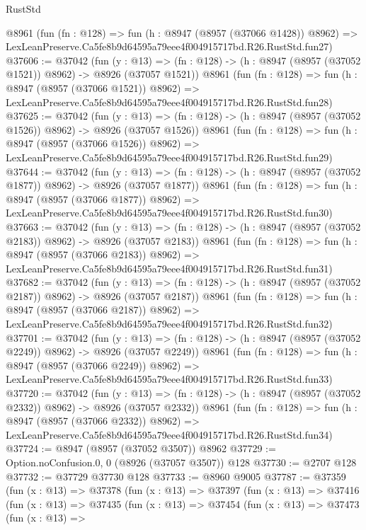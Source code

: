\begin{lexlean}{RustStd}
\begin{coremodule}
    @8961
    (fun (fn : @128) =>
    fun (h : @8947 (@8957 (@37066 @1428)) @8962) =>
    LexLeanPreserve.Ca5fe8b9d64595a79eee4f004915717bd.R26.RustStd.fun27)
@37606 := @37042
    (fun (y : @13) =>
    (fn : @128) -> (h : @8947 (@8957 (@37052 @1521)) @8962) -> @8926 (@37057 @1521))
    @8961
    (fun (fn : @128) =>
    fun (h : @8947 (@8957 (@37066 @1521)) @8962) =>
    LexLeanPreserve.Ca5fe8b9d64595a79eee4f004915717bd.R26.RustStd.fun28)
@37625 := @37042
    (fun (y : @13) =>
    (fn : @128) -> (h : @8947 (@8957 (@37052 @1526)) @8962) -> @8926 (@37057 @1526))
    @8961
    (fun (fn : @128) =>
    fun (h : @8947 (@8957 (@37066 @1526)) @8962) =>
    LexLeanPreserve.Ca5fe8b9d64595a79eee4f004915717bd.R26.RustStd.fun29)
@37644 := @37042
    (fun (y : @13) =>
    (fn : @128) -> (h : @8947 (@8957 (@37052 @1877)) @8962) -> @8926 (@37057 @1877))
    @8961
    (fun (fn : @128) =>
    fun (h : @8947 (@8957 (@37066 @1877)) @8962) =>
    LexLeanPreserve.Ca5fe8b9d64595a79eee4f004915717bd.R26.RustStd.fun30)
@37663 := @37042
    (fun (y : @13) =>
    (fn : @128) -> (h : @8947 (@8957 (@37052 @2183)) @8962) -> @8926 (@37057 @2183))
    @8961
    (fun (fn : @128) =>
    fun (h : @8947 (@8957 (@37066 @2183)) @8962) =>
    LexLeanPreserve.Ca5fe8b9d64595a79eee4f004915717bd.R26.RustStd.fun31)
@37682 := @37042
    (fun (y : @13) =>
    (fn : @128) -> (h : @8947 (@8957 (@37052 @2187)) @8962) -> @8926 (@37057 @2187))
    @8961
    (fun (fn : @128) =>
    fun (h : @8947 (@8957 (@37066 @2187)) @8962) =>
    LexLeanPreserve.Ca5fe8b9d64595a79eee4f004915717bd.R26.RustStd.fun32)
@37701 := @37042
    (fun (y : @13) =>
    (fn : @128) -> (h : @8947 (@8957 (@37052 @2249)) @8962) -> @8926 (@37057 @2249))
    @8961
    (fun (fn : @128) =>
    fun (h : @8947 (@8957 (@37066 @2249)) @8962) =>
    LexLeanPreserve.Ca5fe8b9d64595a79eee4f004915717bd.R26.RustStd.fun33)
@37720 := @37042
    (fun (y : @13) =>
    (fn : @128) -> (h : @8947 (@8957 (@37052 @2332)) @8962) -> @8926 (@37057 @2332))
    @8961
    (fun (fn : @128) =>
    fun (h : @8947 (@8957 (@37066 @2332)) @8962) =>
    LexLeanPreserve.Ca5fe8b9d64595a79eee4f004915717bd.R26.RustStd.fun34)
@37724 := @8947 (@8957 (@37052 @3507)) @8962
@37729 := Option.noConfusion.{0, 0} (@8926 (@37057 @3507)) @128
@37730 := @2707 @128
@37732 := @37729 @37730 @128
@37733 := @8960 @9005
@37787 := @37359
    (fun (x : @13) =>
    @37378
      (fun (x : @13) =>
      @37397
        (fun (x : @13) =>
        @37416
          (fun (x : @13) =>
          @37435
            (fun (x : @13) =>
            @37454
              (fun (x : @13) =>
              @37473
                (fun (x : @13) =>

\end{coremodule}
\end{lexlean}
